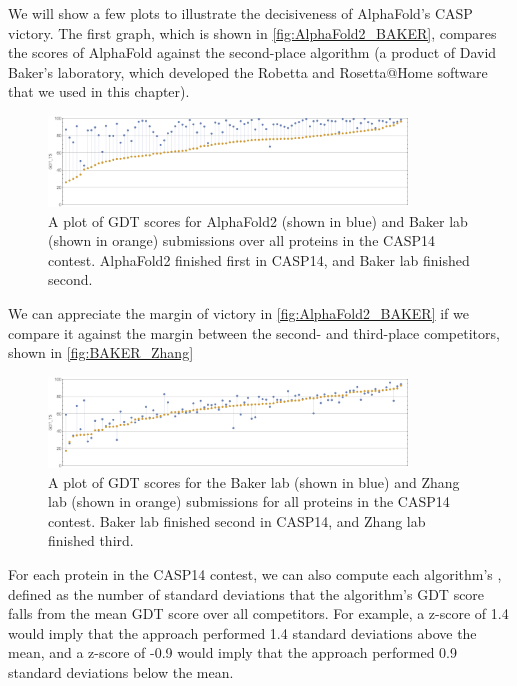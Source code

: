 We will show a few plots to illustrate the decisiveness of AlphaFold's CASP victory. The first graph, which is shown in \autoref{fig:AlphaFold2_BAKER}, compares the scores of AlphaFold against the second-place algorithm (a product of David Baker's laboratory, which developed the Robetta and Rosetta@Home software that we used in this chapter).\\

\begin{figure}[h]
	\centering
	\mySfFamily
	\includegraphics[width = 0.85\textwidth]{../images/AlphaFold2_BAKER.png}
	\caption{A plot of GDT scores for AlphaFold2 (shown in blue) and Baker lab (shown in orange) submissions over all proteins in the CASP14 contest. AlphaFold2 finished first in CASP14, and Baker lab finished second.}
	\label{fig:AlphaFold2_BAKER}
\end{figure}

We can appreciate the margin of victory in \autoref{fig:AlphaFold2_BAKER} if we compare it against the margin between the second- and third-place competitors, shown in \autoref{fig:BAKER_Zhang}\\

\begin{figure}[h]
	\centering
	\mySfFamily
	\includegraphics[width = 0.85\textwidth]{../images/BAKER_Zhang.png}
	\caption{A plot of GDT scores for the Baker lab (shown in blue) and Zhang lab (shown in orange) submissions for all proteins in the CASP14 contest. Baker lab finished second in CASP14, and Zhang lab finished third.}
	\label{fig:BAKER_Zhang}
\end{figure}

For each protein in the CASP14 contest, we can also compute each algorithm's , defined as the number of standard deviations that the algorithm's GDT score falls from the mean GDT score over all competitors. For example, a z-score of 1.4 would imply that the approach performed 1.4 standard deviations above the mean, and a z-score of -0.9 would imply that the approach performed 0.9 standard deviations below the mean.

